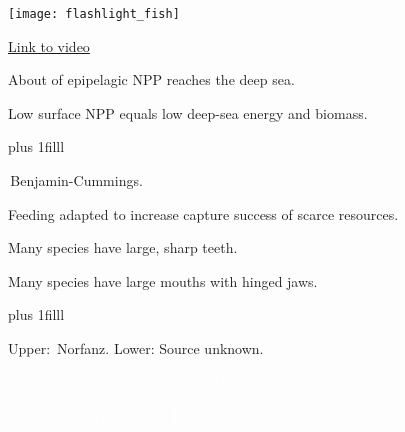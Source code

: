 \documentclass[t]{beamer}
\begin{document}
{
\begin{frame}[c]
	\begin{multicols}{2}
	\columnbreak
		\texttt{[image: flashlight\_fish]}
	\end{multicols}

\vfilll
\hfill \tiny\textcolor{white}{\href{https://youtu.be/VlyGpg35jMA}{Link to video}}
\end{frame}}



{
\begin{frame}[t]{About  of epipelagic NPP reaches the deep sea.}

\vspace*{63mm}

\hangpara Low surface NPP equals low deep-sea energy and biomass.

\vskip0pt plus 1filll

\hfill\tiny\textcopyright\,Benjamin-Cummings.
\end{frame}}


{
\begin{frame}[t]{Feeding adapted to increase capture success of scarce resources.}

\hangpara\parbox{0.45\textwidth}{Many species have large, sharp teeth.}

\hangpara\parbox{0.45\textwidth}{Many species have large mouths with hinged jaws.}

\vskip0pt plus 1filll

\tiny Upper: \textcopyright\,Norfanz. Lower: Source unknown.
\end{frame}}


{
\begin{frame}[b]{\textcolor{white}{Many aphotic fishes have enlarged stomachs.}}

\tiny\textcolor{white}{\textcopyright\,Natural History Museum, London.}
\end{frame}}

{
\begin{frame}[b]
\end{frame}}
\end{document}
